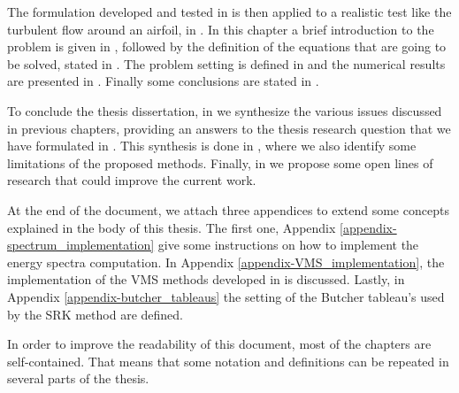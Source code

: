 The formulation developed and tested in  is then applied to a realistic test like the turbulent flow around an airfoil, in . In this chapter a brief introduction to the problem is given in , followed by the definition of the equations that are going to be solved, stated in . The problem setting is defined in  and the numerical results are presented in . Finally some conclusions are stated in .

To conclude the thesis dissertation, in  we synthesize the various issues discussed in previous chapters, providing an answers to the thesis research question that we have formulated in . This synthesis is done in , where we also identify some limitations of the proposed methods. Finally, in  we propose some open lines of research that could improve the current work.

At the end of the document, we attach three appendices to extend some concepts explained in the body of this thesis. The first one, Appendix \ref{appendix-spectrum_implementation} give some instructions on how to implement the energy spectra computation. In Appendix \ref{appendix-VMS_implementation}, the implementation of the VMS methods developed in  is discussed. Lastly, in Appendix \ref{appendix-butcher_tableaus} the setting of the Butcher tableau's used by the SRK method are defined.

In order to improve the readability of this document, most of the chapters are self-contained. That means that some notation and definitions can be repeated in several parts of the thesis.